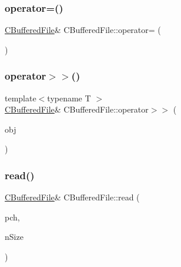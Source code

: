 \subsubsection{\texorpdfstring{operator=()}{operator=()}}
{\footnotesize\ttfamily \mbox{\hyperlink{class_c_buffered_file}{C\+Buffered\+File}}\& C\+Buffered\+File\+::operator= (\begin{DoxyParamCaption}\item[{const \mbox{\hyperlink{class_c_buffered_file}{C\+Buffered\+File}} \&}]{ }\end{DoxyParamCaption})\hspace{0.3cm}{\ttfamily [private]}}

\mbox{\label{class_c_buffered_file_ab570d5f1a173a41100e7b42b4aacbbc5}} 
\subsubsection{\texorpdfstring{operator$>$$>$()}{operator>>()}}
{\footnotesize\ttfamily template$<$typename T $>$ \\
\mbox{\hyperlink{class_c_buffered_file}{C\+Buffered\+File}}\& C\+Buffered\+File\+::operator$>$$>$ (\begin{DoxyParamCaption}\item[{T \&}]{obj }\end{DoxyParamCaption})\hspace{0.3cm}{\ttfamily [inline]}}

\mbox{\label{class_c_buffered_file_a20c6d2a4dbc69a8e5c7ba766d04b3d85}} 
\subsubsection{\texorpdfstring{read()}{read()}}
{\footnotesize\ttfamily \mbox{\hyperlink{class_c_buffered_file}{C\+Buffered\+File}}\& C\+Buffered\+File\+::read (\begin{DoxyParamCaption}\item[{char $\ast$}]{pch,  }\item[{size\+\_\+t}]{n\+Size }\end{DoxyParamCaption})\hspace{0.3cm}{\ttfamily [inline]}}

